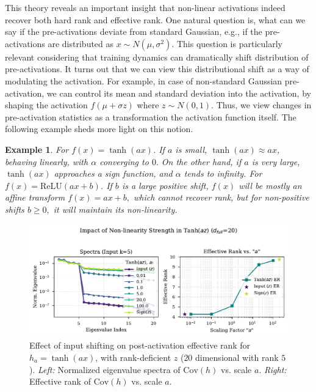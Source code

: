 \documentclass{article}
\newcommand{\ff}[1]{\todo[color=blue!30,size=\tiny]{FF: #1}}
\newtheorem{example}{Example}[section] %
\numberwithin{figure}{section}
\begin{document}
This theory reveals an important insight that non-linear activations indeed recover both hard rank and effective rank.  One natural question is, what can we say if the pre-activations deviate from standard Gaussian, e.g., if the pre-activations are distributed as $x\sim N(\mu,\sigma^2).$ This question is particularly relevant considering that training dynamics can dramatically shift distribution of pre-activations. It turns out that we can view this distributional shift as a way of modulating the activation. For example, in case of non-standard Gaussian pre-activation, we can control its mean and standard deviation into the activation, by shaping the activation $f(\mu + \sigma z)$ where $z\sim N(0,1)$. Thus, we view  changes in pre-activation statistics as a transformation the activation function itself. The following example sheds more light on this notion.

\begin{example}
For $f(x) = \tanh(ax)$. If $a$ is small, $\tanh(ax) \approx ax$, behaving linearly, with $\alpha$ converging to $0.$ On the other hand, if $a$ is very large, $\tanh(ax)$ approaches a sign function, and $\alpha$ tends to infinity.  
For $f(x) = \text{ReLU}(a x + b)$. If $b $ is a large positive shift, $f(x)$ will be mostly an affine transform $f(x) = a x + b, $ which cannot recover rank, but for non-positive shifts $b\ge 0, $ it will maintain its non-linearity. 
\end{example}

\begin{figure}[ht!]
    \centering
\includegraphics[width=0.7\linewidth]{POC/figures/theory_tanh_az_rank.pdf} %
    \vspace{-.3cm}
    \caption{Effect of input shifting on post-activation effective rank for $h_a = \tanh(a x)$, with rank-deficient $z$ ($20$ dimensional with rank $5$). \emph{Left:} Normalized eigenvalue spectra of $\mathrm{Cov}(h)$ vs. scale $a.$ \emph{Right:} Effective rank of $\mathrm{Cov}(h)$ vs. scale $a$. }
    \label{fig:theory_tanh_az_rank}
\end{figure}
\end{document}
